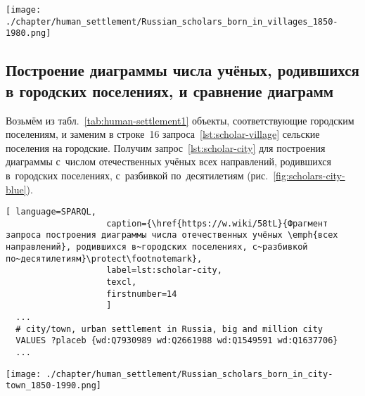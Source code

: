 \begin{figure*}
    \texttt{[image: ./chapter/human\_settlement/Russian\_scholars\_born\_in\_villages\_1850-1980.png]}%
	\label{fig:scholars-village-blue}
    \caption[Количество отечественных учёных, родившихся в сёлах, 2022 год.]{Количество российских и советских учёных \emph{всех направлений}, родившихся в сельских поселениях в 1850--1980-е годы}%
\end{figure*} 






\subsection{Построение диаграммы числа учёных, родившихся в городских поселениях, и сравнение диаграмм}

Возьмём из табл.~\ref{tab:human-settlement1} объекты, соответствующие городским поселениям, 
и заменим в строке~16 запроса~\ref{lst:scholar-village} сельские поселения на городские. 
Получим запрос~\ref{lst:scholar-city} для построения диаграммы 
с~числом отечественных учёных всех направлений, родившихся в~городских поселениях, 
с~разбивкой по~десятилетиям (рис.~\ref{fig:scholars-city-blue}). 


\begin{lstlisting}[ language=SPARQL, 
                    caption={\href{https://w.wiki/58tL}{Фрагмент запроса построения диаграммы числа отечественных учёных \emph{всех направлений}, родившихся в~городских поселениях, с~разбивкой по~десятилетиям}\protect\footnotemark},
                    label=lst:scholar-city,
                    texcl, 
                    firstnumber=14
                    ]
  ...
  # city/town, urban settlement in Russia, big and million city
  VALUES ?placeb {wd:Q7930989 wd:Q2661988 wd:Q1549591 wd:Q1637706}
  ...
\end{lstlisting}%


\begin{figure*}
    \texttt{[image: ./chapter/human\_settlement/Russian\_scholars\_born\_in\_city-town\_1850-1990.png]}%
	\label{fig:scholars-city-blue}
    \caption[Количество отечественных учёных, родившихся в городах, 2022 год.]{Количество российских и советских учёных \emph{всех направлений}, родившихся в городских поселениях в 1850--1990-е годы}%
\end{figure*} 


